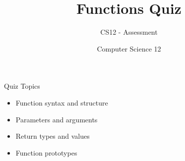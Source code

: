 \documentclass[10pt]{beamer}
\title{Functions Quiz}
\subtitle{CS12 - Assessment}
\author{Computer Science 12}
\date{}
\begin{document}
\begin{frame}
    \titlepage
\end{frame}

\begin{frame}{Quiz Topics}
    \begin{itemize}
        \item Function syntax and structure
        \item Parameters and arguments
        \item Return types and values
        \item Function prototypes
    \end{itemize}
\end{frame}

\end{document}
